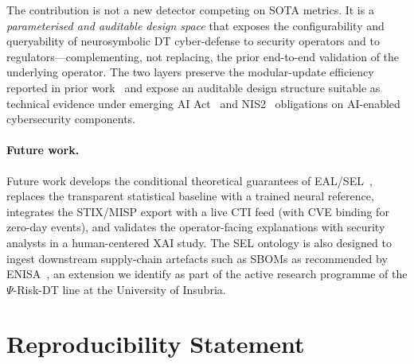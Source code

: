 \documentclass[runningheads]{llncs}
\newcommand{\psiop}{\ensuremath{\Psi}}
\begin{document}
\medskip

The contribution is not a new detector competing on SOTA metrics. It is
a \emph{parameterised and auditable design space} that exposes the
configurability and queryability of neurosymbolic DT cyber-defense to
security operators and to regulators---complementing, not replacing,
the prior end-to-end validation of the underlying operator. The two
layers preserve the modular-update efficiency reported in prior
work~\cite{paper3} and expose an auditable design structure suitable as
technical evidence under emerging AI Act~\cite{aiact} and
NIS2~\cite{nis2} obligations on AI-enabled cybersecurity components.

\paragraph{Future work.} Future work develops the conditional
theoretical guarantees of EAL/SEL~\cite{paper5}, replaces the
transparent statistical baseline with a trained neural reference,
integrates the STIX/MISP export with a live CTI feed (with CVE binding
for zero-day events), and validates the operator-facing explanations
with security analysts in a human-centered XAI study. The SEL ontology
is also designed to ingest downstream supply-chain artefacts such as
SBOMs as recommended by ENISA~\cite{enisasbom}, an extension we identify
as part of the active research programme of the $\psiop$-Risk-DT line
at the University of Insubria.

\section*{Reproducibility Statement}
\label{sec:reproducibility}
\end{document}
